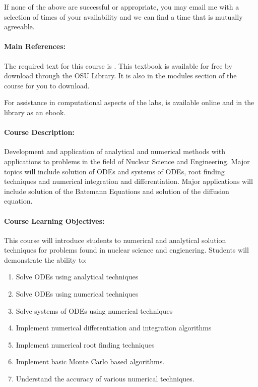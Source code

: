 \documentclass[11pt, a4paper]{article}
\begin{document}
If none of the above are successful or appropriate, you may email me with a
selection of times of your availability and we can find a time that is mutually
agreeable.

\paragraph{Main References:}
The required text for this course is {}. This textbook is available for free by download through the OSU Library. It is also in the modules section of the course for you to download. 

For assistance in computational aspects of the labs, \cite{scopatz_effective_2015} is available online and in the library as an ebook.



\renewcommand{\refname}{\normalfont\selectfont\normalsize}\vspace{-1cm}


\paragraph{Course Description:}
Development and application of analytical and numerical methods with 
applications to problems in the field of Nuclear Science and Engineering. 
Major topics will include solution of ODEs and systems of ODEs, root finding techniques and numerical integration and differentiation. Major applications will
include solution of the Batemann Equations and solution of the diffusion equation. 

\paragraph{Course Learning Objectives:}

This course will introduce students to numerical and analytical solution
techniques for problems found in nuclear science and engienering. Students
will demonstrate the ability to: 

\begin{enumerate}
\item Solve ODEs using analytical techniques
\item Solve ODEs using numerical techniques
\item Solve systems of ODEs using numerical techniques
\item Implement numerical differentiation and integration algorithms
\item Implement numerical root finding techniques
\item Implement basic Monte Carlo based algorithms. 
\item Understand the accuracy of various numerical techniques. 
\end{enumerate}
\end{document}
